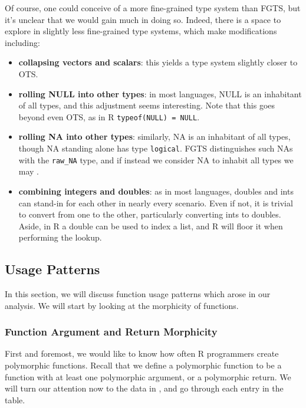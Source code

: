 \documentclass[acmsmall,10pt,review,anonymous]{acmart}\settopmatter{printfolios=true,printccs=false,printacmref=false}
\begin{document}
Of course, one could conceive of a more fine-grained type system than FGTS, but it's unclear that we would gain much in doing so.
Indeed, there is a space to explore in slightly less fine-grained type systems, which make modifications including:

\begin{itemize}

\item {\bf collapsing vectors and scalars}: this yields a type system slightly closer to OTS.

\item {\bf rolling NULL into other types}: in most languages, NULL is an inhabitant of all types, and this adjustment seems interesting.
Note that this goes beyond even OTS, as in R {\tt typeof(NULL) = NULL}.

\item {\bf rolling NA into other types}: 
similarly, NA is an inhabitant of all types, though NA standing alone has type {\tt logical}.
FGTS distinguishes such NAs with the {\tt raw\_NA} type, and if instead we consider NA to inhabit all types we may .

\item {\bf combining integers and doubles}: as in most languages, doubles and ints can stand-in for each other in nearly every scenario.
Even if not, it is trivial to convert from one to the other, particularly converting ints to doubles.
Aside, in R a double can be used to index a list, and R will floor it when performing the lookup.

\end{itemize}

%
%
%
%
\subsection{Usage Patterns}

In this section, we will discuss function usage patterns which arose in our analysis.
We will start by looking at the morphicity of functions.

\subsubsection{Function Argument and Return Morphicity}

First and foremost, we would like to know how often R programmers create polymorphic functions.
Recall that we define a polymorphic function to be a function with at least one polymorphic argument, or a polymorphic return.
We will turn our attention now to the data in , and go through each entry in the table.
\end{document}
